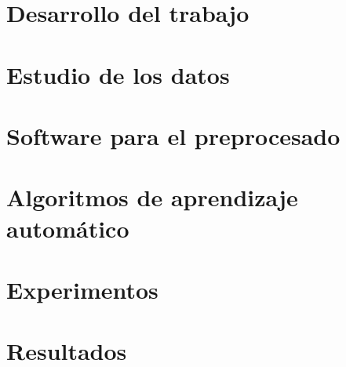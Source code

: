 \chapter{Desarrollo del trabajo}
\label{chapter:desarrollo}


\chapter{Estudio de los datos}
\label{chapter:estudio}


\chapter{Software para el preprocesado}
\label{chapter:preprocesado}


\chapter{Algoritmos de aprendizaje automático}
\label{chapter:algoritmos}


\chapter{Experimentos}
\label{chapter:experimentos}


\chapter{Resultados}
\label{chapter:resultados}

